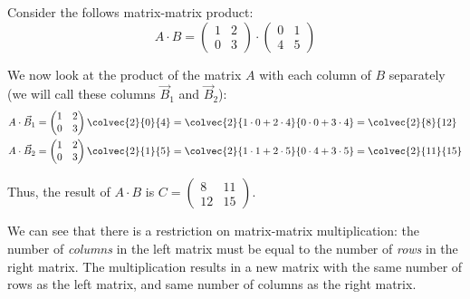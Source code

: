 \begin{example}
  
  Consider the follows matrix-matrix product:
  \begin{equation*}
	A\cdot B = \begin{pmatrix}1&2\\0&3\end{pmatrix}\cdot\begin{pmatrix}0&1\\4&5\end{pmatrix}
  \end{equation*}

  We now look at the product of the matrix $A$ with each column of $B$ separately (we will call these columns $\vec{B}_{1}$ and $\vec{B}_{2}$):
  \begin{align*}
	A\cdot\vec{B}_{1} &= \begin{pmatrix}1&2\\0&3\end{pmatrix}\colvec{2}{0}{4} = \colvec{2}{1\cdot0+2\cdot4}{0\cdot0+3\cdot4}=\colvec{2}{8}{12}\\
	A\cdot\vec{B}_{2} &= \begin{pmatrix}1&2\\0&3\end{pmatrix}\colvec{2}{1}{5} = \colvec{2}{1\cdot1+2\cdot5}{0\cdot4+3\cdot5}=\colvec{2}{11}{15}\\
  \end{align*}

  Thus, the result of $A\cdot B$ is $C=\begin{pmatrix}8&11\\12&15\end{pmatrix}$.
\end{example}

We can see that there is a restriction on matrix-matrix multiplication: the number of \emph{columns} in the left matrix must be equal to the number of \emph{rows} in the right matrix. The multiplication results in a new matrix with the same number of rows as the left matrix, and same number of columns as the right matrix.
\begin{figure}[H]
  \centering
\end{figure}

